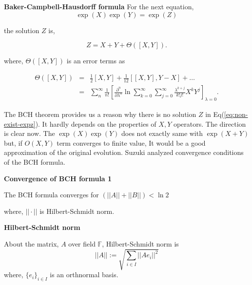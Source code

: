\begin{theorem} \textbf{Baker-Campbell-Hausdorff formula}
    \label{theorem:BCH}
    For the next equation, 
    \begin{equation*}\exp(X) \exp(Y) = \exp(Z)\end{equation*}

    the solution $Z$ is,

    \begin{equation}
        Z = X + Y + \Theta([X, Y]) .
    \end{equation}

    where, $\Theta([X, Y])$ is an error terms as
    
    \begin{eqnarray}
        \Theta([X, Y]) &=& \frac{1}{2}[X, Y] + \frac{1}{12} [[X, Y], Y-X] + \dots \\
        &=& \sum_n^\infty \frac{1}{n!} \left[\frac{\partial^n}{\partial \lambda^n} \ln \sum_{k=0}^\infty \sum_{j=0}^\infty  \frac{\lambda^{k+j}}{k! j!} X^k Y^j \right]_{\lambda = 0} .
    \end{eqnarray}
\end{theorem}

The BCH theorem provides us a reason why there is no solution $Z$ in Eq(\ref{eq:non-exist-expz}).
It hardly depends on the properties of $X, Y$ operators.
The direction is clear now. 
The $\exp(X)\exp(Y)$ does not exactly same with $\exp(X+Y)$ but, if $O(X, Y)$ term converges to finite value,
It would be a good approximation of the original evolution.
Suzuki analyzed convergence conditions of the BCH formula\cite{suzuki_convergence_1977}.

\begin{theorem} \textbf{Convergence of BCH formula 1}

    The BCH formula converges for $(||A|| + ||B||) < \ln2$    
\end{theorem}
where, $||\cdot||$ is Hilbert-Schmidt norm.

\begin{definition} \textbf{Hilbert-Schmidt norm} %

    About the matrix, $A$ over field $\mathbb{F}$, Hilbert-Schmidt norm is 
    \begin{equation*}
        ||A|| := \sqrt{\sum_{i \in I} ||Ae_i||^2}
    \end{equation*} 
    where, $\{e_i\}_{i \in I}$ is an orthnormal basis.
\end{definition}

